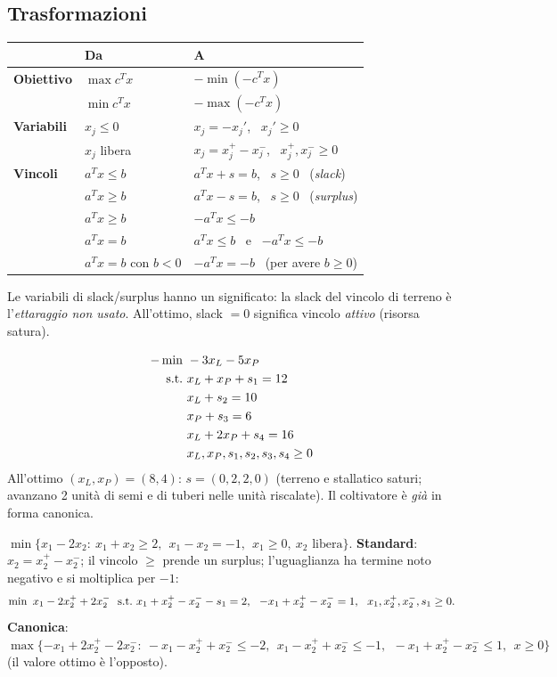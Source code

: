 \subsection{Trasformazioni}
\begin{center}
\renewcommand{\arraystretch}{1.3}
\begin{tabular}{@{}p{}p{}p{}@{}}
\toprule
 & Da & A\\ \midrule
\textbf{Obiettivo} & $\max c^Tx$ & $-\min(-c^T x)$\\
 & $\min c^Tx$ & $-\max(-c^Tx)$\\ \midrule
\textbf{Variabili} & $x_j\le0$ & $x_j=-x_j'$, \ $x_j'\ge0$\\
 & $x_j$ libera & $x_j=x_j^+-x_j^-$, \ $x_j^+,x_j^-\ge0$\\ \midrule
\textbf{Vincoli} & $a^Tx\le b$ & $a^Tx+s=b$, \ $s\ge0$ \ (\emph{slack})\\
 & $a^Tx\ge b$ & $a^Tx-s=b$, \ $s\ge0$ \ (\emph{surplus})\\
 & $a^Tx\ge b$ & $-a^Tx\le -b$\\
 & $a^Tx=b$ & $a^Tx\le b$ \ e \ $-a^Tx\le -b$\\
 & $a^Tx=b$ con $b<0$ & $-a^Tx=-b$ \ (per avere $b\ge0$)\\
\bottomrule
\end{tabular}
\end{center}
Le variabili di slack/surplus hanno un significato: la slack del vincolo di terreno è l'\emph{ettaraggio non usato}. All'ottimo, slack $=0$ significa vincolo \emph{attivo} (risorsa satura).

\begin{esbox}
\[
\begin{aligned}
-\min\ & -3x_L-5x_P\\
\text{s.t.}\ & x_L+x_P+s_1=12\\
& x_L+s_2=10\\
& x_P+s_3=6\\
& x_L+2x_P+s_4=16\\
& x_L,x_P,s_1,s_2,s_3,s_4\ge0
\end{aligned}
\]
All'ottimo $(x_L,x_P)=(8,4)$: $s=(0,2,2,0)$ (terreno e stallatico saturi; avanzano 2 unità di semi e di tuberi nelle unità riscalate). Il coltivatore è \emph{già} in forma canonica.
\end{esbox}

\begin{esbox}
$\min\{x_1-2x_2:\ x_1+x_2\ge 2,\ \ x_1-x_2=-1,\ \ x_1\ge0,\ x_2\text{ libera}\}$.
\textbf{Standard}: $x_2=x_2^+-x_2^-$; il vincolo $\ge$ prende un surplus; l'uguaglianza ha termine noto negativo e si moltiplica per $-1$:
\[\min\ x_1-2x_2^++2x_2^-\ \ \st\ x_1+x_2^+-x_2^--s_1=2,\ \ -x_1+x_2^+-x_2^-=1,\ \ x_1,x_2^+,x_2^-,s_1\ge0.\]
\textbf{Canonica}: $\max\{-x_1+2x_2^+-2x_2^-:\ -x_1-x_2^++x_2^-\le-2,\ \ x_1-x_2^++x_2^-\le-1,\ \ -x_1+x_2^+-x_2^-\le1,\ \ x\ge0\}$ (il valore ottimo è l'opposto).
\end{esbox}

